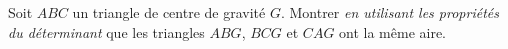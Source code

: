 Soit $ABC$ un triangle de centre de gravité $G$. Montrer \emph{en utilisant les propriétés du déterminant} que les triangles $ABG$, $BCG$ et $CAG$ ont la même aire. 